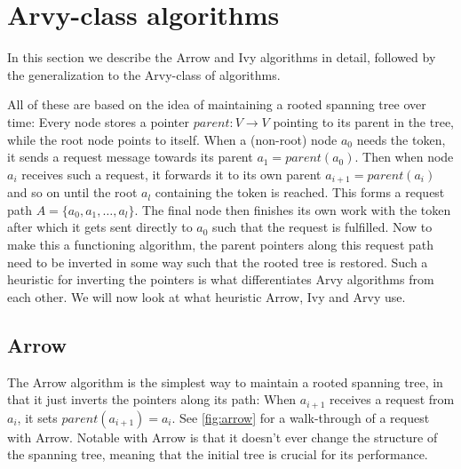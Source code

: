 \documentclass[a4paper, oneside]{discothesis}
\begin{document}
\newpage
\section{Arvy-class algorithms}

In this section we describe the Arrow and Ivy algorithms in detail, followed by the generalization to the Arvy-class of algorithms.

All of these are based on the idea of maintaining a rooted spanning tree over time: Every node stores a pointer $parent : V \rightarrow V$ pointing to its parent in the tree, while the root node points to itself. When a (non-root) node $a_{0}$ needs the token, it sends a request message towards its parent $a_{1}=parent(a_{0})$. Then when node $a_{i}$ receives such a request, it forwards it to its own parent $a_{i+1}=parent(a_{i})$ and so on until the root $a_{l}$ containing the token is reached. This forms a request path $A=\{a_{0},a_{1},\dots,a_{l}\}$. The final node then finishes its own work with the token after which it gets sent directly to $a_{0}$ such that the request is fulfilled. Now to make this a functioning algorithm, the parent pointers along this request path need to be inverted in some way such that the rooted tree is restored. Such a heuristic for inverting the pointers is what differentiates Arvy algorithms from each other. We will now look at what heuristic Arrow, Ivy and Arvy use.

\subsection{Arrow}
\label{intro:arrow}

The Arrow algorithm is the simplest way to maintain a rooted spanning tree, in that it just inverts the pointers along its path: When $a_{i+1}$ receives a request from $a_{i}$, it sets $parent(a_{i+1})=a_{i}$. See \autoref{fig:arrow} for a walk-through of a request with Arrow. Notable with Arrow is that it doesn't ever change the structure of the spanning tree, meaning that the initial tree is crucial for its performance.
\end{document}
